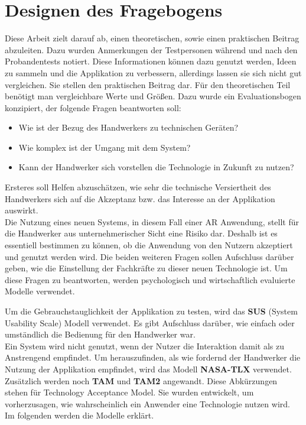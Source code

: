 \section{Designen des Fragebogens}

Diese Arbeit zielt darauf ab, einen theoretischen, sowie einen praktischen Beitrag abzuleiten. Dazu wurden Anmerkungen der Testpersonen während und nach den Probandentests notiert. Diese Informationen können dazu genutzt werden, Ideen zu sammeln und die Applikation zu verbessern, allerdings lassen sie sich nicht gut vergleichen. Sie stellen den praktischen Beitrag dar. Für den theoretischen Teil benötigt man vergleichbare Werte und Größen. Dazu wurde ein Evaluationsbogen konzipiert, der folgende Fragen beantworten soll:

\begin{itemize}
	\item Wie ist der Bezug des Handwerkers zu technischen Geräten?
	\item Wie komplex ist der Umgang mit dem System?
	\item Kann der Handwerker sich vorstellen die Technologie in Zukunft zu nutzen?
\end{itemize}

Ersteres soll Helfen abzuschätzen, wie sehr die technische Versiertheit des Handwerkers sich auf die Akzeptanz bzw. das Interesse an der Applikation auswirkt. \\
Die Nutzung eines neuen Systems, in diesem Fall einer AR Anwendung, stellt für die Handwerker aus unternehmerischer Sicht eine Risiko dar. Deshalb ist es essentiell bestimmen zu können, ob die Anwendung von den Nutzern akzeptiert und genutzt werden wird. Die beiden weiteren Fragen sollen Aufschluss darüber geben, wie die Einstellung der Fachkräfte zu dieser neuen Technologie ist. Um diese Fragen zu beantworten, werden psychologisch und wirtschaftlich evaluierte Modelle verwendet. 

Um die Gebrauchstauglichkeit der Applikation zu testen, wird das \textbf{SUS} (System Usability Scale) \cite{brooke_sus_nodate} Modell verwendet. Es gibt Aufschluss darüber, wie einfach oder umständlich die Bedienung für den Handwerker war. \\
Ein System wird nicht genutzt, wenn der Nutzer die Interaktion damit als zu Anstrengend empfindet. Um herauszufinden, als wie fordernd der Handwerker die Nutzung der Applikation empfindet, wird das Modell \textbf{NASA-TLX} verwendet. \\
Zusätzlich werden noch \textbf{TAM} und \textbf{TAM2} angewandt. Diese Abkürzungen stehen für Technology Acceptance Model. Sie wurden entwickelt, um vorherzusagen, wie wahrscheinlich ein Anwender eine Technologie nutzen wird. \\
Im folgenden werden die Modelle erklärt.

